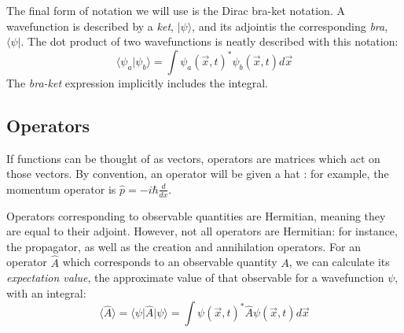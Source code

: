 The final form of notation we will use is the Dirac bra-ket notation. A wavefunction is described by
a \textit{ket}, $\vert\psi\rangle$, and its adjointis the corresponding \textit{bra},
$\langle\psi\vert$. The dot product of two wavefunctions is neatly described with this notation:
\begin{equation*}
\langle \psi_a \vert \psi_b \rangle = 
\int \psi_a\left(\vec{x},t\right)^* \psi_b\left(\vec{x},t\right) d\vec{x}
\end{equation*}
The \textit{bra-ket} expression implicitly includes the integral.

\subsection*{Operators}

If functions can be thought of as vectors, operators are matrices which act on those vectors. By
convention, an operator will be given a hat : for example, the momentum operator is
$\hat{p} = -i\hbar\frac{d}{dx}$.

Operators corresponding to observable quantities are Hermitian, meaning they are equal to their
adjoint. However, not all operators are Hermitian: for instance, the propagator, as well as the
creation and annihilation operators. For an operator $\hat{A}$ which corresponds to an observable
quantity $A$, we can calculate its \textit{expectation value}, the approximate value of that
observable for a wavefunction $\psi$, with an integral:
\begin{equation*}
\langle \hat{A} \rangle = \langle \psi \vert \hat{A} \vert \psi \rangle = 
\int \psi\left(\vec{x},t\right)^* \hat{A} \psi\left(\vec{x},t\right) d\vec{x}
\end{equation*}
